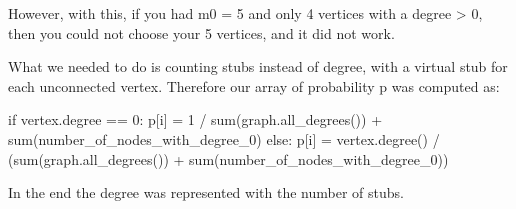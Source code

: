 \documentclass{article}
\begin{document}
However, with this, if you had m0 = 5 and only 4 vertices with a degree > 0, 
then you could not choose your 5 vertices, and it did not work.

What we needed to do is counting stubs instead of degree, with a virtual stub 
for each unconnected vertex. Therefore our array of probability p was computed 
as:

\begin{python}
if vertex.degree == 0:
    p[i] = 1 / sum(graph.all_degrees()) + sum(number_of_nodes_with_degree_0)
else:
    p[i] = vertex.degree() / (sum(graph.all_degrees()) + sum(number_of_nodes_with_degree_0))
\end{python}

In the end the degree was represented with the number of stubs.
\end{document}
